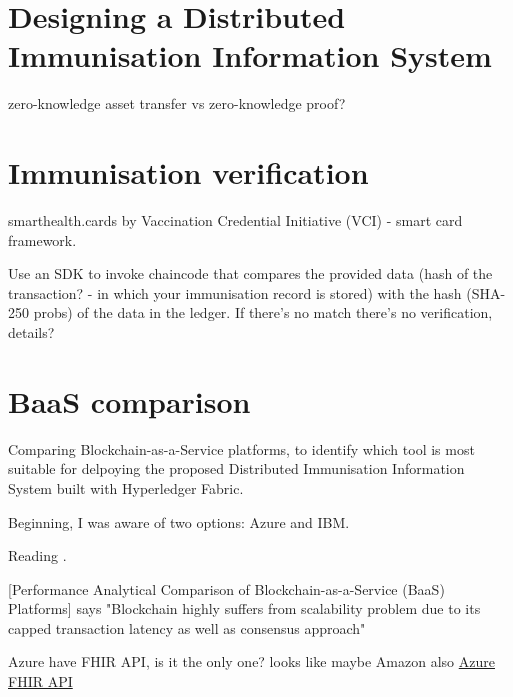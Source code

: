 \documentclass{report}
\begin{document}
\begin{flushleft}
\chapter{Designing a Distributed Immunisation Information System}
zero-knowledge asset transfer vs zero-knowledge proof? 

\chapter{Immunisation verification}
smarthealth.cards by Vaccination Credential Initiative (VCI) - smart card framework.\linebreak[1]

Use an SDK to invoke chaincode that compares the provided data (hash of the transaction? - in which your immunisation record is stored) with the hash (SHA-250 probs) of the data in the ledger. If there's no match there's no verification, details?

\chapter{BaaS comparison}
Comparing Blockchain-as-a-Service platforms, to identify which tool is most suitable for delpoying the proposed Distributed Immunisation Information System built with Hyperledger Fabric.\linebreak[1]

Beginning, I was aware of two options: Azure and IBM.\linebreak[1]

Reading \cite{onik_performance_2019}.\linebreak[1]

[Performance Analytical Comparison of Blockchain-as-a-Service (BaaS) Platforms] says "Blockchain highly suffers from scalability problem due to its capped transaction
latency as well as consensus approach"\linebreak[1]

Azure have FHIR API, is it the only one? looks like maybe Amazon also \href{'https://azure.microsoft.com/en-gb/services/azure-api-for-fhir/?ocid=AID754288&wt.mc_id=azfr-c9-scottha%2CCFID0475'}{Azure FHIR API}




\end{flushleft}

\printbibliography
\end{document}
